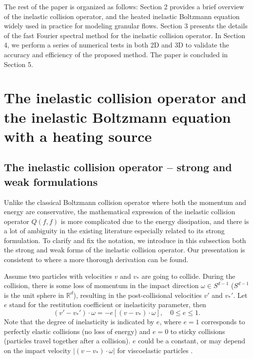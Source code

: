 \documentclass[review, times]{elsarticle}
\begin{document}
The rest of the paper is organized as follows: Section 2 provides a brief overview of the inelastic collision operator, and the heated inelastic Boltzmann equation widely used in practice for modeling granular flows. Section 3 presents the details of the fast Fourier spectral method for the inelastic collision operator. In Section 4, we perform a series of numerical tests in both 2D and 3D to validate the accuracy and efficiency of the proposed method. The paper is concluded in Section 5.

\section{The inelastic collision operator and the inelastic Boltzmann equation with a heating source}

\subsection{The inelastic collision operator -- strong and weak formulations}

Unlike the classical Boltzmann collision operator \cite{Cercignani} where both the momentum and energy are conservative, the mathematical expression of the inelastic collision operator $Q(f,f)$ is more complicated due to the energy dissipation, and there is a lot of ambiguity in the existing literature especially related to its strong formulation. To clarify and fix the notation, we introduce in this subsection both the strong and weak forms of the inelastic collision operator. Our presentation is consistent to \cite{CCC09} where a more thorough derivation can be found.

Assume two particles with velocities $v$ and $v_*$ are going to collide. During the collision, there is some loss of momentum in the impact direction $\omega \in S^{d-1}$ ($S^{d-1}$ is the unit sphere in $\mathbb{R}^d$), resulting in the post-collisional velocities $v'$ and $v_*'$. Let $e$ stand for the restitution coefficient or inelasticity parameter, then
\begin{equation} \label{IO}
(v'-v_*')\cdot \omega=-e[(v-v_*)\cdot \omega], \quad 0 \leq e \leq 1.
\end{equation}
Note that the degree of inelasticity is indicated by $e$, where $e=1$ corresponds to perfectly elastic collisions (no loss of energy) and $e=0$ to sticky collisions (particles travel together after a collision). $e$ could be a constant, or may depend on the impact velocity $|(v-v_*)\cdot \omega|$ for viscoelastic particles \cite{BP}.
\end{document}
